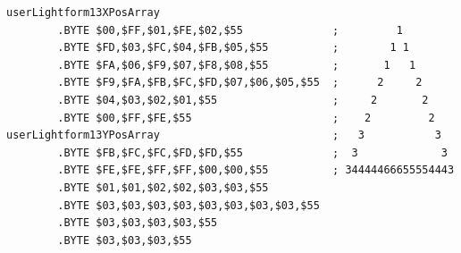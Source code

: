 \begin{minipage}[b]{0.48\linewidth}
\begin{lrbox}{\mybox}%
\hspace{1cm}
\begin{lstlisting}[basicstyle=\ttfamily\tiny,escapechar=\%]
userLightform13XPosArray
        .BYTE $00,$FF,$01,$FE,$02,$55              ;         1        
        .BYTE $FD,$03,$FC,$04,$FB,$05,$55          ;        1 1       
        .BYTE $FA,$06,$F9,$07,$F8,$08,$55          ;       1   1      
        .BYTE $F9,$FA,$FB,$FC,$FD,$07,$06,$05,$55  ;      2     2     
        .BYTE $04,$03,$02,$01,$55                  ;     2       2    
        .BYTE $00,$FF,$FE,$55                      ;    2         2   
userLightform13YPosArray                           ;   3           3  
        .BYTE $FB,$FC,$FC,$FD,$FD,$55              ;  3             3 
        .BYTE $FE,$FE,$FF,$FF,$00,$00,$55          ; 34444466655554443
        .BYTE $01,$01,$02,$02,$03,$03,$55
        .BYTE $03,$03,$03,$03,$03,$03,$03,$03,$55
        .BYTE $03,$03,$03,$03,$55
        .BYTE $03,$03,$03,$55
\end{lstlisting}
\end{lrbox}%
\scalebox{0.8}{\usebox{\mybox}}

\end{minipage}
%
%
